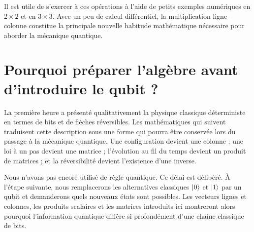 Il est utile de s’exercer à ces opérations à l’aide de petits exemples numériques en \(2\times2\) et en \(3\times3\). Avec un peu de calcul différentiel, la multiplication ligne--colonne constitue la principale nouvelle habitude mathématique nécessaire pour aborder la mécanique quantique.

\begin{classroomqa}
\end{classroomqa}

\section{Pourquoi préparer l’algèbre avant d’introduire le qubit ?}

La première heure a présenté qualitativement la physique classique déterministe en termes de bits et de flèches réversibles. Les mathématiques qui suivent traduisent cette description sous une forme qui pourra être conservée lors du passage à la mécanique quantique. Une configuration devient une colonne ; une loi à un pas devient une matrice ; l’évolution au fil du temps devient un produit de matrices ; et la réversibilité devient l’existence d’une inverse.

Nous n’avons pas encore utilisé de règle quantique. Ce délai est délibéré. À l’étape suivante, nous remplacerons les alternatives classiques \(\left\lvert0\right\rangle\) et \(\left\lvert1\right\rangle\) par un qubit et demanderons quels nouveaux états sont possibles. Les vecteurs lignes et colonnes, les produits scalaires et les matrices introduits ici montreront alors pourquoi l’information quantique diffère si profondément d’une chaîne classique de bits.

\begin{classroomqa}
\end{classroomqa}